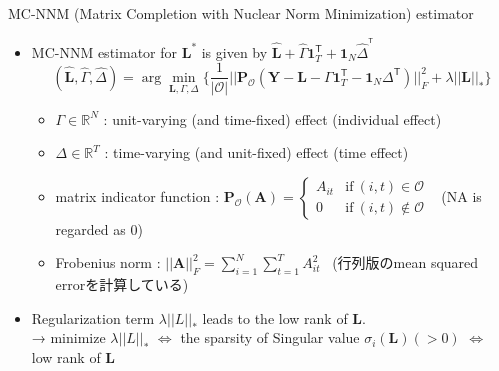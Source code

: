 \documentclass[xcolor=svgnames,aspectratio=169]{beamer}
\newcommand{\R}{\mathbb{R}}
\begin{document}
\begin{frame}{MC-NNM (Matrix Completion with Nuclear Norm Minimization) estimator}
    \begin{itemize}
        \item MC-NNM estimator for $\mathbf{L^*}$ is given by $\mathbf{\hat{L}}+\hat{\Gamma}\mathbf{1}_T^{\mathsf{T}} + \mathbf{1}_N\hat{\Delta}^{^\mathsf{T}}$
        \[
        (\mathbf{\hat{L}}, \hat{\Gamma}, \hat{\Delta})=\arg \min_{\mathbf{L},\Gamma,\Delta} 
        \{
            \frac{1}{|\mathcal{O} |}  ||\mathbf{P_{\mathcal{O} }}({\mathbf{Y}-\mathbf{L}-\Gamma}\mathbf{1}_T^{\mathsf{T}}-\mathbf{1}_N\Delta^{\mathsf{T}})||_F^2+\lambda||\mathbf{L}||_*
        \}
        \]
        \begin{itemize}
            \item $\Gamma\in\R^N$ : unit-varying (and time-fixed) effect (individual effect)
            \item $\Delta\in\R^T$ : time-varying (and unit-fixed) effect (time effect) 
            \item matrix indicator function : $\mathbf{P_{\mathcal{O} }}(\mathbf{A})=
            \begin{cases}
                A_{it} & \text{if} \ (i,t)\in\mathcal{O} \\ 0 & \text{if} \ (i,t) \notin \mathcal{O}  
            \end{cases}$ \ (NA is regarded as $0$)
            \item Frobenius norm : $||\mathbf{A}||_F^2=\sum_{i=1}^N\sum_{t=1}^T A_{it}^2$ \ (行列版のmean squared errorを計算している)
        \end{itemize}
        \item Regularization term $\lambda||L||_*$ leads to \alert{the low rank of $\mathbf{L}$}. \\
        → minimize $\lambda||L||_*$ $\Leftrightarrow $ the sparsity of Singular value $\sigma_i(\mathbf{L})(>0)$ $\Leftrightarrow $ low rank of $\mathbf{L}$
    \end{itemize}
\end{frame}
\end{document}
